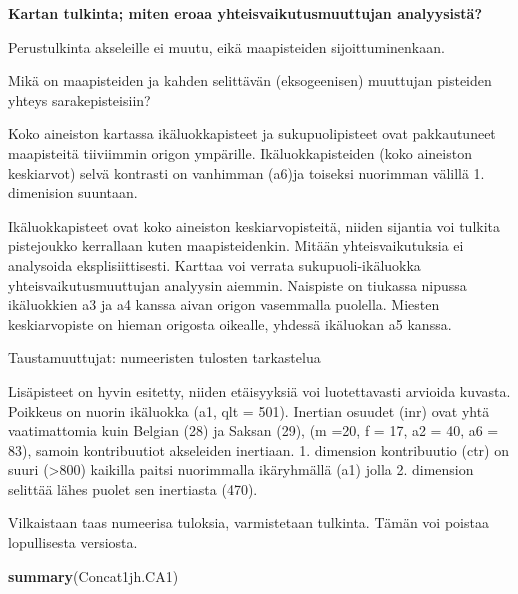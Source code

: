 \documentclass[
  finnish,
]{book}
\newenvironment{Shaded}{\begin{snugshade}}{\end{snugshade}}
\newcommand{\KeywordTok}[1]{\textcolor[rgb]{0.13,0.29,0.53}{\textbf{#1}}}
\newcommand{\NormalTok}[1]{#1}
\begin{document}
\textbf{Kartan tulkinta; miten eroaa yhteisvaikutusmuuttujan analyysistä?}

Perustulkinta akseleille ei muutu, eikä maapisteiden sijoittuminenkaan.

Mikä on maapisteiden ja kahden selittävän (eksogeenisen) muuttujan pisteiden yhteys sarakepisteisiin?

Koko aineiston kartassa ikäluokkapisteet ja sukupuolipisteet ovat pakkautuneet maapisteitä tiiviimmin origon ympärille. Ikäluokkapisteiden (koko aineiston keskiarvot) selvä kontrasti on vanhimman (a6)ja toiseksi nuorimman välillä 1. dimenision suuntaan.

Ikäluokkapisteet ovat koko aineiston keskiarvopisteitä, niiden sijantia voi tulkita pistejoukko kerrallaan kuten maapisteidenkin. Mitään yhteisvaikutuksia ei analysoida eksplisiittisesti. Karttaa voi verrata sukupuoli-ikäluokka yhteisvaikutusmuuttujan analyysin aiemmin. Naispiste on tiukassa nipussa ikäluokkien a3 ja a4 kanssa aivan origon vasemmalla puolella. Miesten keskiarvopiste on hieman origosta oikealle, yhdessä ikäluokan a5 kanssa.

Taustamuuttujat: numeeristen tulosten tarkastelua

Lisäpisteet on hyvin esitetty, niiden etäisyyksiä voi luotettavasti arvioida kuvasta. Poikkeus on nuorin ikäluokka (a1, qlt = 501). Inertian osuudet (inr) ovat yhtä vaatimattomia kuin Belgian (28) ja Saksan (29), (m =20, f = 17, a2 = 40, a6 = 83), samoin kontribuutiot akseleiden inertiaan. 1. dimension kontribuutio (ctr) on suuri (\textgreater800) kaikilla paitsi nuorimmalla ikäryhmällä (a1) jolla 2. dimension selittää lähes puolet sen inertiasta (470).

Vilkaistaan taas numeerisa tuloksia, varmistetaan tulkinta. Tämän voi poistaa
lopullisesta versiosta.

\begin{Shaded}
\begin{Highlighting}[]
\KeywordTok{summary}\NormalTok{(Concat1jh.CA1)}
\end{Highlighting}
\end{Shaded}
\end{document}
